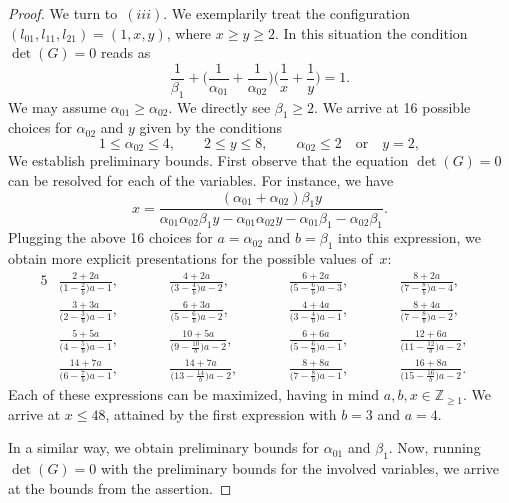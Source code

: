 \documentclass[pdftex]{sigma}%
\theoremstyle{definition}
\def\ZZ{{\mathbb Z}}
\numberwithin{equation}{section}
\begin{document}
\begin{proof}
We turn to~$(iii)$. We exemplarily treat the
configuration $(l_{01},l_{11},l_{21}) = (1,x,y)$,
where $x \ge y \ge 2$.
In this situation the condition $\det(G) = 0$
reads as
\begin{equation*}
\frac{1}{\beta_1}+
\bigg( \frac{1}{\alpha_{01}} + \frac{1}{\alpha_{02}} \bigg)
\bigg( \frac{1}{x} + \frac{1}{y} \bigg) =1.
\end{equation*}
We may assume $\alpha_{01} \ge \alpha_{02}$. We directly see $\beta_1 \ge 2$.
We arrive at 16 possible choices for
$\alpha_{02}$ and $y$ given by the conditions
\[
1 \le \alpha_{02} \le 4,\qquad
2 \le y \le 8,\qquad
\alpha_{02} \le 2\quad \text{or}\quad y = 2,
\]
We establish preliminary bounds.
First observe that the equation $\det(G) = 0$ can
be resolved for each of the variables.
For instance, we have
\[
x
 =
\frac{(\alpha_{01} + \alpha_{02})\beta_1 y}{\alpha_{01} \alpha_{02} \beta_1 y - \alpha_{01} \alpha_{02} y - \alpha_{01} \beta_1 - \alpha_{02} \beta_1} .
\]
Plugging the above 16 choices for $a = \alpha_{02}$
and $b = \beta_1$ into this expression, we obtain more
explicit presentations for the possible values of~$x$:
\begin{alignat*}{5}
&\frac{2 + 2a}{\big(1 - \frac{2}{b}\big) a - 1},\qquad&&
\frac{4 + 2a}{\big(3 - \frac{4}{b}\big) a - 2},\qquad&&
\frac{6 + 2a}{\big(5 - \frac{6}{b}\big) a - 3},\qquad&&
\frac{8 + 2a}{\big(7 - \frac{8}{b}\big) a - 4},&
\\
&\frac{3 + 3a}{\big(2 - \frac{3}{b}\big) a - 1},\qquad&&
\frac{6 + 3a}{\big(5 - \frac{6}{b}\big) a - 2},\qquad&&
\frac{4 + 4a}{\big(3 - \frac{4}{b}\big) a - 1},\qquad&&
\frac{8 + 4a}{\big(7 - \frac{8}{b}\big) a - 2},&
\\
&\frac{5 + 5a}{\big(4 - \frac{5}{b}\big) a - 1},\qquad&&
\frac{10 + 5a}{\big(9 - \frac{10}{b}\big) a - 2},\qquad&&
\frac{6 + 6a}{\big(5 - \frac{6}{b}\big) a - 1},\qquad&&
\frac{ 12 + 6a}{\big(11 - \frac{12}{b}\big) a - 2},&
\\
&\frac{14 + 7a}{\big(6 - \frac{7}{b}\big) a - 1},\qquad&&
\frac{14 + 7 a}{\big(13 - \frac{14}{b}\big) a - 2},\qquad&&
\frac{8 + 8 a}{\big(7 - \frac{8}{b}\big) a - 1},\qquad&&
\frac{16 + 8 a}{\big(15 - \frac{16}{b}\big) a - 2}.&
\end{alignat*}
Each of these expressions can be maximized,
having in mind $a,b,x \in \ZZ_{\ge 1}$.
We arrive at $x \le 48$, attained by the first
expression with $b=3$ and $a=4$.

In a similar way, we obtain preliminary bounds for
$\alpha_{01}$ and $\beta_1$.
Now, running $\det(G)=0$ with the preliminary
bounds for the involved variables, we arrive at
the bounds from the assertion.
\end{proof}
\end{document}
